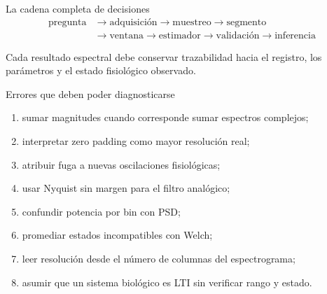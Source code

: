 \documentclass[
  ignorenonframetext,
  aspectratio=169,
  spanish,
]{beamer}
\providecommand{\faExclamation}{\faIcon{exclamation}}
\providecommand{\tightlist}{%
  \setlength{\itemsep}{0pt}\setlength{\parskip}{0pt}}
\begin{document}
\begin{frame}{La cadena completa de decisiones}
  \protect{}\label{la-cadena-completa-de-decisiones}
  \[\begin{aligned}
      \text{pregunta} & \rightarrow\text{adquisición}\rightarrow\text{muestreo}\rightarrow\text{segmento}                            \\
                      & \rightarrow\text{ventana}\rightarrow\text{estimador}\rightarrow\text{validación}\rightarrow\text{inferencia}
    \end{aligned}\]

  \begin{tcolorbox}[enhanced jigsaw, arc=.35mm, bottomrule=.15mm, bottomtitle=1mm, breakable, colback=white, colbacktitle=quarto-callout-important-color!10!white, colframe=quarto-callout-important-color-frame, coltitle=black, left=2mm, leftrule=.75mm, opacityback=0, opacitybacktitle=0.6, rightrule=.15mm, title=\textcolor{quarto-callout-important-color}{\faExclamation}\hspace{0.5em}{Importante}, titlerule=0mm, toprule=.15mm, toptitle=1mm]

    Cada resultado espectral debe conservar trazabilidad hacia el registro,
    los parámetros y el estado fisiológico observado.

  \end{tcolorbox}
\end{frame}

\begin{frame}{Errores que deben poder diagnosticarse}
  \protect{}\label{errores-que-deben-poder-diagnosticarse}
  \begin{enumerate}
    \tightlist
    \item
          sumar magnitudes cuando corresponde sumar espectros complejos;
    \item
          interpretar zero padding como mayor resolución real;
    \item
          atribuir fuga a nuevas oscilaciones fisiológicas;
    \item
          usar Nyquist sin margen para el filtro analógico;
    \item
          confundir potencia por bin con PSD;
    \item
          promediar estados incompatibles con Welch;
    \item
          leer resolución desde el número de columnas del espectrograma;
    \item
          asumir que un sistema biológico es LTI sin verificar rango y estado.
  \end{enumerate}
\end{frame}
\end{document}
